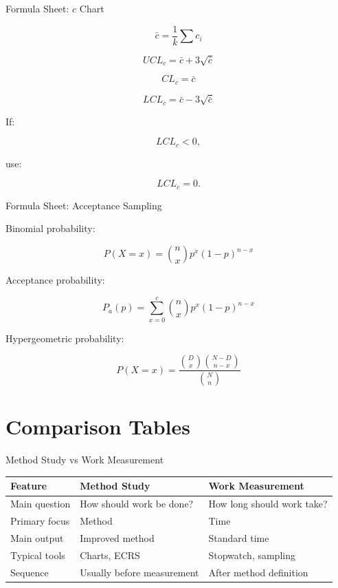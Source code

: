 \documentclass[aspectratio=169,10pt]{beamer}
\begin{document}

\begin{frame}[shrink=18]{Formula Sheet: $c$ Chart}
\small

\[
\boxed{
\bar c=
\frac{1}{k}\sum c_i
}
\]

\[
\boxed{
UCL_c=
\bar c+3\sqrt{\bar c}
}
\]

\[
\boxed{
CL_c=\bar c
}
\]

\[
\boxed{
LCL_c=
\bar c-3\sqrt{\bar c}
}
\]

If:

\[
LCL_c<0,
\]

use:

\[
\boxed{
LCL_c=0.
}
\]

\end{frame}


\begin{frame}[shrink=18]{Formula Sheet: Acceptance Sampling}
\small

Binomial probability:

\[
\boxed{
P(X=x)
=
{n\choose x}
p^x(1-p)^{n-x}
}
\]

Acceptance probability:

\[
\boxed{
P_a(p)=
\sum_{x=0}^{c}
{n\choose x}
p^x(1-p)^{n-x}
}
\]

Hypergeometric probability:

\[
\boxed{
P(X=x)
=
\frac{
{D\choose x}
{N-D\choose n-x}
}{
{N\choose n}
}
}
\]

\end{frame}


\section{Comparison Tables}

\begin{frame}[shrink=18]{Method Study vs Work Measurement}
\small

\begin{tabularx}{\textwidth}{YYY}
\toprule
Feature & Method Study & Work Measurement\\
\midrule
Main question & How should work be done? & How long should work take?\\
Primary focus & Method & Time\\
Main output & Improved method & Standard time\\
Typical tools & Charts, ECRS & Stopwatch, sampling\\
Sequence & Usually before measurement & After method definition\\
\bottomrule
\end{tabularx}

\end{frame}
\end{document}
